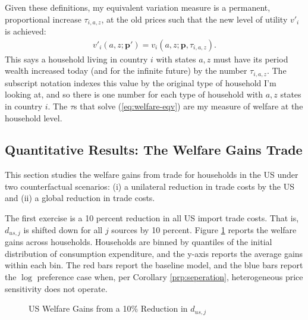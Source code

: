 \documentclass[12pt,pdftex]{article}
\begin{document}
\begin{onehalfspacing}
Given these definitions, my equivalent variation measure is a permanent, proportional increase $\tau_{i,a,z}$, at the old prices such that the new level of utility $v'_i$ is achieved:
\begin{align}
v'_i(a,z ; \mathbf{p'}) = v_i(a,z ; \mathbf{p}, \tau_{i, a,z}). \label{eq:welfare-eqv}
\end{align}
This says a household living in country $i$ with states $a,z$ must have its period wealth increased today (and for the infinite future) by the number $\tau_{i,a,z}$. The subscript notation indexes this value by the original type of household I'm looking at, and so there is one number for each type of household with $a,z$ states in country $i$. The $\tau$s that solve (\ref{eq:welfare-eqv}) are my measure of welfare at the household level.

\subsection{Quantitative Results: The Welfare Gains Trade}

This section studies the welfare gains from trade for households in the US under two counterfactual scenarios: (i) a unilateral reduction in trade costs by the US and (ii) a global reduction in trade costs.

The first exercise is a 10 percent reduction in all US import trade costs. That is, $d_{us,j}$ is shifted down for all $j$ sources by 10 percent. Figure \ref{fig:welfare-households} reports the welfare gains across households. Households are binned by quantiles of the initial distribution of consumption expenditure, and the y-axis reports the average gains within each bin. The red bars report the baseline model, and the blue bars report the $\log$ preference case when, per Corollary \ref{prp:seperation}, heterogeneous price sensitivity does not operate.

\begin{figure}[!t]
\caption{US Welfare Gains from a 10\% Reduction in $d_{us,j}$ }\label{fig:welfare-households}
\end{figure}


\end{onehalfspacing}
\end{document}

